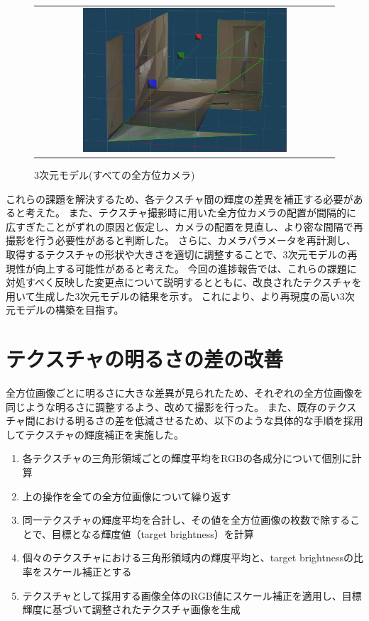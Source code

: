\documentclass[]{jarticle}          %
\begin{document}
\begin{figure}[H]
  \begin{center}
    \begin{tabular}{c}
      \includegraphics[width=0.7\textwidth]{figures/3dmodel012.png}
    \end{tabular}
  \end{center}
  \caption{3次元モデル(すべての全方位カメラ)}
  \label{two}
\end{figure}
これらの課題を解決するため、各テクスチャ間の輝度の差異を補正する必要があると考えた。
また、テクスチャ撮影時に用いた全方位カメラの配置が間隔的に広すぎたことがずれの原因と仮定し、カメラの配置を見直し、より密な間隔で再撮影を行う必要性があると判断した。
さらに、カメラパラメータを再計測し、取得するテクスチャの形状や大きさを適切に調整することで、3次元モデルの再現性が向上する可能性があると考えた。
今回の進捗報告では、これらの課題に対処すべく反映した変更点について説明するとともに、改良されたテクスチャを用いて生成した3次元モデルの結果を示す。
これにより、より再現度の高い3次元モデルの構築を目指す。

\section{テクスチャの明るさの差の改善}
全方位画像ごとに明るさに大きな差異が見られたため、それぞれの全方位画像を同じような明るさに調整するよう、改めて撮影を行った。
また、既存のテクスチャ間における明るさの差を低減させるため、以下のような具体的な手順を採用してテクスチャの輝度補正を実施した。
\begin{enumerate}
  \item 各テクスチャの三角形領域ごとの輝度平均をRGBの各成分について個別に計算
  \item 上の操作を全ての全方位画像について繰り返す
  \item 同一テクスチャの輝度平均を合計し、その値を全方位画像の枚数で除することで、目標となる輝度値（target brightness）を計算
  \item 個々のテクスチャにおける三角形領域内の輝度平均と、target brightnessの比率をスケール補正とする
  \item テクスチャとして採用する画像全体のRGB値にスケール補正を適用し、目標輝度に基づいて調整されたテクスチャ画像を生成
\end{enumerate}
\end{document}
